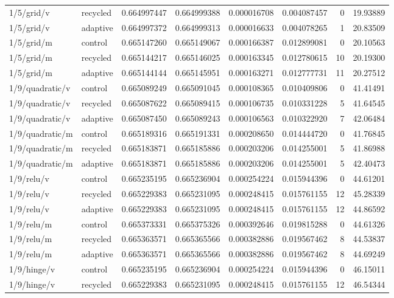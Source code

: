 \begin{longtable}{llrrrrrr}
1/5/grid/v & recycled & 0.664997447 & 0.664999388 & 0.000016708 & 0.004087457 & 0 & 19.93889 \\
1/5/grid/v & adaptive & 0.664997372 & 0.664999313 & 0.000016633 & 0.004078265 & 1 & 20.83509 \\
1/5/grid/m & control & 0.665147260 & 0.665149067 & 0.000166387 & 0.012899081 & 0 & 20.10563 \\
1/5/grid/m & recycled & 0.665144217 & 0.665146025 & 0.000163345 & 0.012780615 & 10 & 20.19300 \\
1/5/grid/m & adaptive & 0.665144144 & 0.665145951 & 0.000163271 & 0.012777731 & 11 & 20.27512 \\
1/9/quadratic/v & control & 0.665089249 & 0.665091045 & 0.000108365 & 0.010409806 & 0 & 41.41491 \\
1/9/quadratic/v & recycled & 0.665087622 & 0.665089415 & 0.000106735 & 0.010331228 & 5 & 41.64545 \\
1/9/quadratic/v & adaptive & 0.665087450 & 0.665089243 & 0.000106563 & 0.010322920 & 7 & 42.06484 \\
1/9/quadratic/m & control & 0.665189316 & 0.665191331 & 0.000208650 & 0.014444720 & 0 & 41.76845 \\
1/9/quadratic/m & recycled & 0.665183871 & 0.665185886 & 0.000203206 & 0.014255001 & 5 & 41.86988 \\
1/9/quadratic/m & adaptive & 0.665183871 & 0.665185886 & 0.000203206 & 0.014255001 & 5 & 42.40473 \\
1/9/relu/v & control & 0.665235195 & 0.665236904 & 0.000254224 & 0.015944396 & 0 & 44.61201 \\
1/9/relu/v & recycled & 0.665229383 & 0.665231095 & 0.000248415 & 0.015761155 & 12 & 45.28339 \\
1/9/relu/v & adaptive & 0.665229383 & 0.665231095 & 0.000248415 & 0.015761155 & 12 & 44.86592 \\
1/9/relu/m & control & 0.665373331 & 0.665375326 & 0.000392646 & 0.019815288 & 0 & 44.61326 \\
1/9/relu/m & recycled & 0.665363571 & 0.665365566 & 0.000382886 & 0.019567462 & 8 & 44.53837 \\
1/9/relu/m & adaptive & 0.665363571 & 0.665365566 & 0.000382886 & 0.019567462 & 8 & 44.69249 \\
1/9/hinge/v & control & 0.665235195 & 0.665236904 & 0.000254224 & 0.015944396 & 0 & 46.15011 \\
1/9/hinge/v & recycled & 0.665229383 & 0.665231095 & 0.000248415 & 0.015761155 & 12 & 46.54344 \\

\end{longtable}
